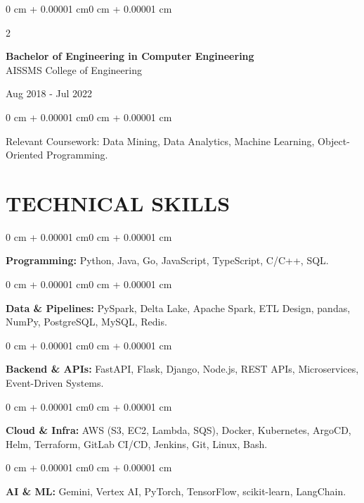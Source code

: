 \documentclass[10pt, letterpaper]{article}
\newenvironment{onecolentry}{
    \begin{adjustwidth}{0 cm + 0.00001 cm}{0 cm + 0.00001 cm}
}{
    \end{adjustwidth}
}
\newenvironment{twocolentry}[2][]{
    \onecolentry
    \def\secondColumn{#2}
    \setcolumnwidth{\fill, 4.5 cm}
    \begin{paracol}{2}
}{
    \switchcolumn \raggedleft \secondColumn
    \end{paracol}
    \endonecolentry
}
\begin{document}
\begin{twocolentry}{
    Aug 2018 - Jul 2022
}
    \textbf{Bachelor of Engineering in Computer Engineering} \\
    AISSMS College of Engineering
\end{twocolentry}
\begin{onecolentry}
Relevant Coursework: Data Mining, Data Analytics, Machine Learning, Object-Oriented Programming.
\end{onecolentry}
\section{TECHNICAL SKILLS}
\begin{onecolentry}
\textbf{Programming:} Python, Java, Go, JavaScript, TypeScript, C/C++, SQL.
\end{onecolentry}
\vspace{0.06 cm}
\begin{onecolentry}
\textbf{Data \& Pipelines:} PySpark, Delta Lake, Apache Spark, ETL Design, pandas, NumPy, PostgreSQL, MySQL, Redis.
\end{onecolentry}
\vspace{0.06 cm}
\begin{onecolentry}
\textbf{Backend \& APIs:} FastAPI, Flask, Django, Node.js, REST APIs, Microservices, Event-Driven Systems.
\end{onecolentry}
\vspace{0.06 cm}
\begin{onecolentry}
\textbf{Cloud \& Infra:} AWS (S3, EC2, Lambda, SQS), Docker, Kubernetes, ArgoCD, Helm, Terraform, GitLab CI/CD, Jenkins, Git, Linux, Bash.
\end{onecolentry}
\vspace{0.06 cm}
\begin{onecolentry}
\textbf{AI \& ML:} Gemini, Vertex AI, PyTorch, TensorFlow, scikit-learn, LangChain.
\end{onecolentry}

\end{document}
